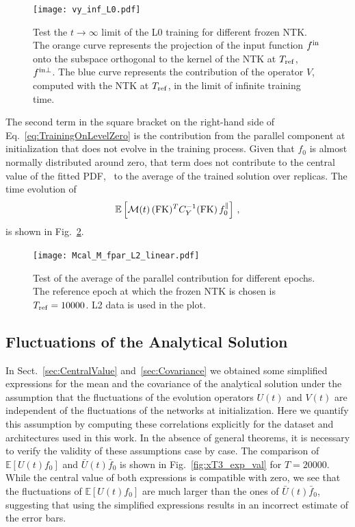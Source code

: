 \begin{figure}[t]
  \centering
  \texttt{[image: vy\_inf\_L0.pdf]}  
  \caption{Test the $t\to\infty$ limit of the L0 training for different frozen
  NTK. The orange curve represents the projection of the input function $f^{\rm in}$
  onto the subspace orthogonal to the kernel of the NTK at $T_{\rm ref}$, \ie\
  $f^{\rm in \perp}$. The blue curve represents the contribution of the operator $V$,
  computed with the NTK at $T_{\rm ref}$, in the limit of infinite training
  time.}
  \label{fig:InfiniteTimeVterm}
\end{figure}

The second term in the square bracket on the right-hand side of
Eq.~\eqref{eq:TrainingOnLevelZero} is the contribution from the parallel
component at initialization that does not evolve in the training process. Given
that $f_0$ is almost normally distributed around zero, that term does not
contribute to the central value of the fitted PDF, \ie\ to the average of the
trained solution over replicas. The time evolution of 
\begin{align}
  \label{eq:AverageLevelZeroUcheck}
  \mathbb{E}\left[\mathcal{M}(t)\, (\mathrm{FK})^T C_{Y}^{-1} (\mathrm{FK})\, 
    f_{0}^\parallel\right]\, ,
\end{align}
is shown in Fig.~\ref{fig:AverageLevelZeroUcheck}.
\begin{figure}[h!]
  \centering
  \texttt{[image: Mcal\_M\_fpar\_L2\_linear.pdf]} 
  \caption{Test of the average of the parallel contribution for different
  epochs. The reference epoch at which the frozen NTK is chosen is $T_{\rm ref}
  = 10000$. L2 data is used in the plot.}
  \label{fig:AverageLevelZeroUcheck}
\end{figure}

\FloatBarrier

\subsection{Fluctuations of the Analytical Solution}
\label{sec:CheckCovariance}

In Sect.~\ref{sec:CentralValue} and~\ref{sec:Covariance} we obtained some
simplified expressions for the mean and the covariance of the analytical
solution under the assumption that the fluctuations of the evolution operators
$U(t)$ and $V(t)$ are independent of the fluctuations of the networks at
initialization. Here we quantify this assumption by computing these correlations
explicitly for the dataset and architectures used in this work. In the absence
of general theorems, it is necessary to verify the validity of these assumptions
case by case. The comparison of $\mathbb{E}\left[U(t) f_{0}\right]$ and
$\bar{U}(t) \bar{f}_{0}$ is shown in Fig.~\ref{fig:xT3_exp_val} for $T=20000$.
While the central value of both expressions is compatible with zero, we see that
the fluctuations of $\mathbb{E}\left[U(t) f_{0}\right]$ are much larger than the
ones of $\bar{U}(t) \bar{f}_{0}$, suggesting that using the simplified
expressions results in an incorrect estimate of the error bars. 

